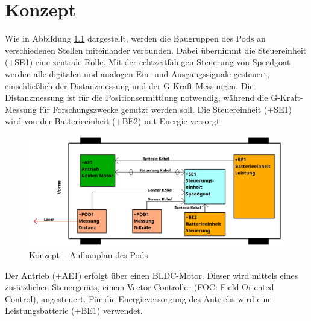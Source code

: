 \chapter{Konzept}
\label{chapter:Konzept}


Wie in Abbildung \ref{img_1_1:Konzept:0} dargestellt, werden die Baugruppen des Pods an verschiedenen Stellen miteinander verbunden. Dabei übernimmt die Steuereinheit (+SE1) eine zentrale Rolle. Mit der echtzeitfähigen Steuerung von Speedgoat werden alle digitalen und analogen Ein- und Ausgangssignale gesteuert, einschließlich der Distanzmessung und der G-Kraft-Messungen. Die Distanzmessung ist für die Positionsermittlung notwendig, während die G-Kraft-Messung für Forschungszwecke genutzt werden soll. Die Steuereinheit (+SE1) wird von der Batterieeinheit (+BE2) mit Energie versorgt.

\begin{figure}[!ht]
	\begin{center}
		\includegraphics[width=1\textwidth]{img/3_schaltplan/sp_aufbauplan_0.png}
		\caption{Konzept – Aufbauplan des Pods}
		\label{img_1_1:Konzept:0}
	\end{center}
\end{figure}

Der Antrieb (+AE1) erfolgt über einen BLDC-Motor. Dieser wird mittels eines zusätzlichen Steuergeräts, einem Vector-Controller (FOC: Field Oriented Control), angesteuert. Für die Energieversorgung des Antriebs wird eine Leistungsbatterie (+BE1) verwendet.

